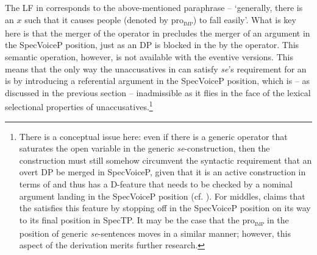 \documentclass[output=paper,nonflat,newtxmath]{langsci/langscibook}
\begin{document}
\noindent The LF in  corresponds to the above-mentioned paraphrase  – `generally, there is an $x$ such that it causes people (denoted by pro\textsubscript{\textsc{imp}}) to fall easily'. What is key here is that the merger of the  operator in  precludes the merger of an argument in the SpecVoiceP position, just as an  DP is blocked in the   by the operator. This semantic operation, however, is not available with the eventive versions. This means that the only way the unaccusatives in  can satisfy \textit{se}’s requirement for an  is by introducing a referential argument in the SpecVoiceP position, which is -- as discussed in the previous section -- inadmissible as it flies in the face of the lexical selectional properties of unaccusatives.\footnote{There is a conceptual issue here: even if there is a generic operator that saturates the open variable in the generic  \textit{se}-construction, then the construction must still somehow circumvent the syntactic requirement that an overt DP be merged in SpecVoiceP, given that it is an active construction in terms of  and thus has a D-feature that needs to be checked by a nominal argument landing in the SpecVoiceP position (cf. ). For  middles, \citet{schaffer2007} claims that the  satisfies this feature by stopping off in the SpecVoiceP position on its way to its final position in SpecTP. It may be the case that the pro\textsubscript{\textsc{imp}} in the  position of generic  \textit{se}-sentences moves in a similar manner; however, this aspect  of the derivation merits further research.}
\end{document}
